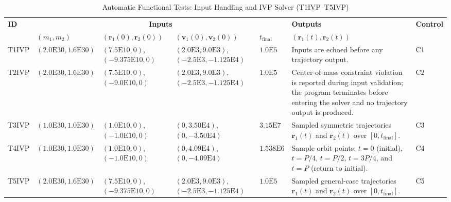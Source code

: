 \documentclass[12pt, titlepage]{article}
\begin{document}
\begin{landscape}
\begin{table}[p]
\centering
\small
\setlength{\tabcolsep}{3pt}
\renewcommand{\arraystretch}{1.2}
\begin{tabularx}{\linewidth}{|p{1.2cm}|p{2.8cm}|p{2.6cm}|p{3.4cm}|p{1.4cm}|>{\raggedright\arraybackslash}X|p{2.5cm}|}
\hline
\textbf{ID} &
\multicolumn{4}{c|}{\textbf{Inputs}} &
\textbf{Outputs} &
\textbf{Control} \\
\cline{2-6}
 & $(m_1,m_2)$ &
$(\mathbf{r}_1(0),\mathbf{r}_2(0))$ &
$(\mathbf{v}_1(0),\mathbf{v}_2(0))$ &
$t_{\text{final}}$ &
$(\mathbf{r}_1(t), \mathbf{r}_2(t))$ &  \\
\hline
T1IVP & $(2.0\mathrm{E}30,1.6\mathrm{E}30)$ &
$(7.5\mathrm{E}10,0)$, $(-9.375\mathrm{E}10,0)$ &
$(2.0\mathrm{E}3,9.0\mathrm{E}3)$, $(-2.5\mathrm{E}3,-1.125\mathrm{E}4)$ &
$1.0\mathrm{E}5$ &
Inputs are echoed before any trajectory output. &
C1 \\
\hline
T2IVP & $(2.0\mathrm{E}30,1.6\mathrm{E}30)$ &
$(7.5\mathrm{E}10,0)$, $(-9.0\mathrm{E}10,0)$ &
$(2.0\mathrm{E}3,9.0\mathrm{E}3)$, $(-2.5\mathrm{E}3,-1.125\mathrm{E}4)$ &
$1.0\mathrm{E}5$ &
Center-of-mass constraint violation is reported during input validation; the program terminates before entering the solver and no trajectory output is produced. &
C2 \\
\hline
T3IVP & $(1.0\mathrm{E}30,1.0\mathrm{E}30)$ &
$(1.0\mathrm{E}10,0)$, $(-1.0\mathrm{E}10,0)$ &
$(0,3.50\mathrm{E}4)$, $(0,-3.50\mathrm{E}4)$ &
$3.15\mathrm{E}7$ &
Sampled symmetric trajectories $\mathbf{r}_1(t)$ and $\mathbf{r}_2(t)$ over
$[0,t_{\text{final}}]$. &
C3 \\
\hline
T4IVP & $(1.0\mathrm{E}30, 1.0\mathrm{E}30)$ &
$(1.0\mathrm{E}10,0)$, $(-1.0\mathrm{E}10,0)$ &
$(0,4.09\mathrm{E}4)$, $(0,-4.09\mathrm{E}4)$ &
$1.538\mathrm{E}6$ &
Sample orbit points:
$t=0$ (initial), $t=P/4$, $t=P/2$, $t=3P/4$, and $t=P$ (return to initial). &
C4 \\
\hline
T5IVP & $(2.0\mathrm{E}30,1.6\mathrm{E}30)$ &
$(7.5\mathrm{E}10,0)$, $(-9.375\mathrm{E}10,0)$ &
$(2.0\mathrm{E}3,9.0\mathrm{E}3)$, $(-2.5\mathrm{E}3,-1.125\mathrm{E}4)$ &
$1.0\mathrm{E}5$ &
Sampled general-case trajectories $\mathbf{r}_1(t)$ and $\mathbf{r}_2(t)$ over
$[0,t_{\text{final}}]$. &
C5 \\
\hline
\end{tabularx}
\caption{Automatic Functional Tests: Input Handling and IVP Solver (T1IVP--T5IVP)}
\label{tab:func-tests}
\end{table}
\end{landscape}
\end{document}
